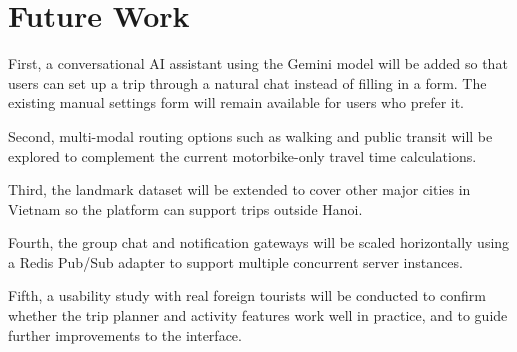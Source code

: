 \documentclass[a4paper,12pt]{report}
\begin{document}
\section{Future Work}

First, a conversational AI assistant using the Gemini model will be added so that users can set up a trip through a natural chat instead of filling in a form. The existing manual settings form will remain available for users who prefer it.

Second, multi-modal routing options such as walking and public transit will be explored to complement the current motorbike-only travel time calculations.

Third, the landmark dataset will be extended to cover other major cities in Vietnam so the platform can support trips outside Hanoi.

Fourth, the group chat and notification gateways will be scaled horizontally using a Redis Pub/Sub adapter to support multiple concurrent server instances.

Fifth, a usability study with real foreign tourists will be conducted to confirm whether the trip planner and activity features work well in practice, and to guide further improvements to the interface.

\newpage
\setlength{\parindent}{15pt}
\setlength{\parskip}{0em}
\linespread{1}\selectfont
\end{document}
